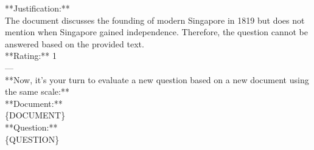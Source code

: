 \begin{tcolorbox}
**Justification:**\\
The document discusses the founding of modern Singapore in 1819 but does not mention when Singapore gained independence. Therefore, the question cannot be answered based on the provided text.\\

**Rating:** 1\\
---\\

**Now, it's your turn to evaluate a new question based on a new document using the same scale:**\\

**Document:**\\
\{DOCUMENT\}\\

**Question:**\\
\{QUESTION\}\\

\end{tcolorbox}
